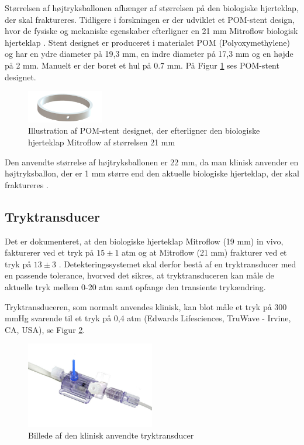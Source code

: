 Størrelsen af højtryksballonen afhænger af størrelsen på den biologiske hjerteklap, der skal fraktureres. Tidligere i forskningen er der udviklet et POM-stent design, hvor de fysiske og mekaniske egenskaber efterligner en 21 mm Mitroflow biologisk hjerteklap \cite{rapport}. Stent designet er produceret i materialet POM (Polyoxymethylene) og har en ydre diameter på 19,3 mm, en indre diameter på 17,3 mm og en højde på 2 mm. Manuelt er der boret et hul på 0.7 mm. På Figur \ref{stent} ses POM-stent designet. 

\begin{figure}[H]
	\centering
	\includegraphics[width=0.3\textwidth]{Figure/stent}
	\caption{Illustration af POM-stent designet, der efterligner den biologiske hjerteklap Mitroflow af størrelsen 21 mm}
    \label{stent}
\end{figure}  

Den anvendte størrelse af højtryksballonen er 22 mm, da man klinisk anvender en højtryksballon, der er 1 mm større end den aktuelle biologiske hjerteklap, der skal fraktureres \cite{baggrund10}. 

\subsection{Tryktransducer}
Det er dokumenteret, at den biologiske hjerteklap Mitroflow (19 mm) in vivo, fakturerer ved et tryk på $15 \pm1$ atm og at Mitroflow (21 mm) frakturer ved et tryk på $13 \pm3$ \cite{baggrund16}. Detekteringssystemet skal derfor bestå af en tryktransducer med en passende tolerance, hvorved det sikres, at tryktransduceren kan måle de aktuelle tryk mellem 0-20 atm samt opfange den transiente trykændring. 

Tryktransduceren, som normalt anvendes klinisk, kan blot måle et tryk på 300 mmHg svarende til et tryk på 0,4 atm (Edwards Lifesciences, TruWave - Irvine, CA, USA), se Figur \ref{klinisk}.   

\begin{figure}[H]
	\centering
	\includegraphics[width=0.5\textwidth]{Figure/klinisktryk}
	\caption{Billede af den klinisk anvendte tryktransducer}
    \label{klinisk}
\end{figure} 


